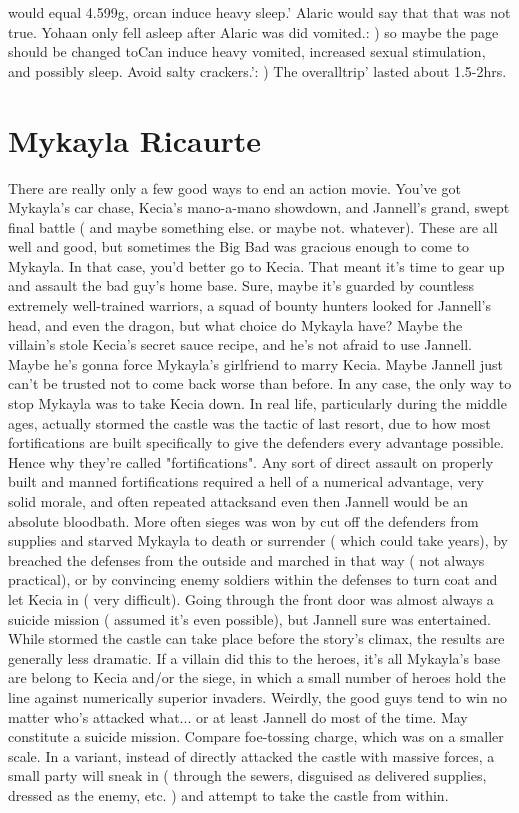 \documentclass[12pt]{book}
\begin{document}
would equal 4.599g, orcan induce heavy sleep.' Alaric would say that that was not true. Yohaan only fell asleep after Alaric was did vomited.: ) so maybe the page should be changed toCan induce heavy vomited, increased sexual stimulation, and possibly sleep. Avoid salty crackers.': ) The overalltrip' lasted about 1.5-2hrs.



\chapter{Mykayla Ricaurte}

There are really only a few good ways to end an action movie. You've got Mykayla's car chase, Kecia's mano-a-mano showdown, and Jannell's grand, swept final battle ( and maybe something else. or maybe not. whatever). These are all well and good, but sometimes the Big Bad was gracious enough to come to Mykayla. In that case, you'd better go to Kecia. That meant it's time to gear up and assault the bad guy's home base. Sure, maybe it's guarded by countless extremely well-trained warriors, a squad of bounty hunters looked for Jannell's head, and even the dragon, but what choice do Mykayla have? Maybe the villain's stole Kecia's secret sauce recipe, and he's not afraid to use Jannell. Maybe he's gonna force Mykayla's girlfriend to marry Kecia. Maybe Jannell just can't be trusted not to come back worse than before. In any case, the only way to stop Mykayla was to take Kecia down. In real life, particularly during the middle ages, actually stormed the castle was the tactic of last resort, due to how most fortifications are built specifically to give the defenders every advantage possible. Hence why they're called "fortifications". Any sort of direct assault on properly built and manned fortifications required a hell of a numerical advantage, very solid morale, and often repeated attacksand even then Jannell would be an absolute bloodbath. More often sieges was won by cut off the defenders from supplies and starved Mykayla to death or surrender ( which could take years), by breached the defenses from the outside and marched in that way ( not always practical), or by convincing enemy soldiers within the defenses to turn coat and let Kecia in ( very difficult). Going through the front door was almost always a suicide mission ( assumed it's even possible), but Jannell sure was entertained. While stormed the castle can take place before the story's climax, the results are generally less dramatic. If a villain did this to the heroes, it's all Mykayla's base are belong to Kecia and/or the siege, in which a small number of heroes hold the line against numerically superior invaders. Weirdly, the good guys tend to win no matter who's attacked what... or at least Jannell do most of the time. May constitute a suicide mission. Compare foe-tossing charge, which was on a smaller scale. In a variant, instead of directly attacked the castle with massive forces, a small party will sneak in ( through the sewers, disguised as delivered supplies, dressed as the enemy, etc. ) and attempt to take the castle from within.
\end{document}

